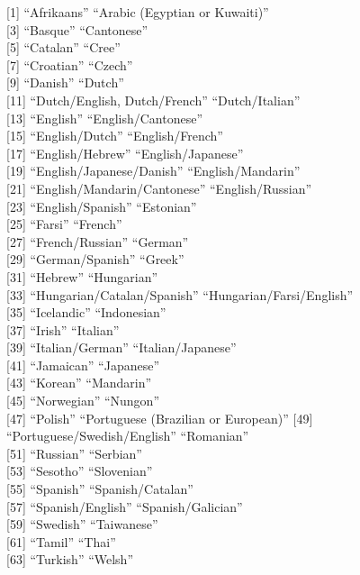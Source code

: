 \documentclass[
]{article}
\begin{document}
{[}1{]} ``Afrikaans'' ``Arabic (Egyptian or Kuwaiti)''\\
{[}3{]} ``Basque'' ``Cantonese''\\
{[}5{]} ``Catalan'' ``Cree''\\
{[}7{]} ``Croatian'' ``Czech''\\
{[}9{]} ``Danish'' ``Dutch''\\
{[}11{]} ``Dutch/English, Dutch/French'' ``Dutch/Italian''\\
{[}13{]} ``English'' ``English/Cantonese''\\
{[}15{]} ``English/Dutch'' ``English/French''\\
{[}17{]} ``English/Hebrew'' ``English/Japanese''\\
{[}19{]} ``English/Japanese/Danish'' ``English/Mandarin''\\
{[}21{]} ``English/Mandarin/Cantonese'' ``English/Russian''\\
{[}23{]} ``English/Spanish'' ``Estonian''\\
{[}25{]} ``Farsi'' ``French''\\
{[}27{]} ``French/Russian'' ``German''\\
{[}29{]} ``German/Spanish'' ``Greek''\\
{[}31{]} ``Hebrew'' ``Hungarian''\\
{[}33{]} ``Hungarian/Catalan/Spanish'' ``Hungarian/Farsi/English''\\
{[}35{]} ``Icelandic'' ``Indonesian''\\
{[}37{]} ``Irish'' ``Italian''\\
{[}39{]} ``Italian/German'' ``Italian/Japanese''\\
{[}41{]} ``Jamaican'' ``Japanese''\\
{[}43{]} ``Korean'' ``Mandarin''\\
{[}45{]} ``Norwegian'' ``Nungon''\\
{[}47{]} ``Polish'' ``Portuguese (Brazilian or European)'' {[}49{]}
``Portuguese/Swedish/English'' ``Romanian''\\
{[}51{]} ``Russian'' ``Serbian''\\
{[}53{]} ``Sesotho'' ``Slovenian''\\
{[}55{]} ``Spanish'' ``Spanish/Catalan''\\
{[}57{]} ``Spanish/English'' ``Spanish/Galician''\\
{[}59{]} ``Swedish'' ``Taiwanese''\\
{[}61{]} ``Tamil'' ``Thai''\\
{[}63{]} ``Turkish'' ``Welsh''
\end{document}
